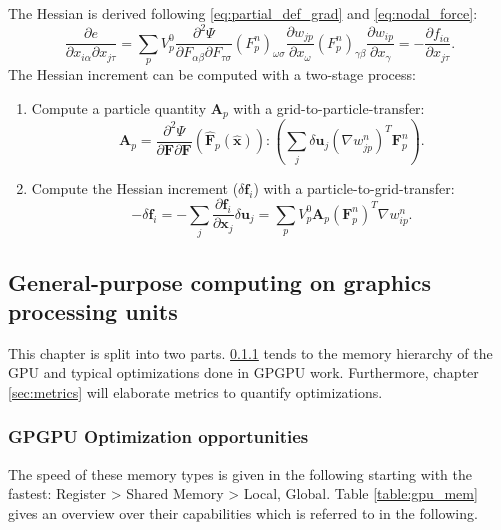 \documentclass[m,times]{cgMA}
\begin{document}
The Hessian is derived following \ref{eq:partial_def_grad} and \ref{eq:nodal_force}:
\begin{equation}
  \frac{\partial e}{\partial {x}_{i\alpha} \partial x_{j\tau}}
= \sum_p V^0_p\frac { \partial ^ { 2 } \Psi } { \partial  { F}_{\alpha \beta} \partial { F } _{\tau \sigma}}  (F^n_p)_{\omega \sigma}\frac{\partial w_{jp}}{\partial x_\omega} (F^n_p)_{\gamma\beta}\frac{\partial w_{ip}}{\partial x_\gamma} = -\frac{\partial {f}_{i\alpha}}{\partial x_{j\tau}}.
\end{equation}
The Hessian increment can be computed with a two-stage process:
\begin{enumerate}
  \item Compute a particle quantity $\boldsymbol{A}_p$ with a grid-to-particle-transfer:
    \begin{equation}\label{eq:Ap}
    \boldsymbol{A}_p = \frac { \partial ^ { 2 } \Psi } { \partial \boldsymbol { F } \partial \boldsymbol { F } } ( \hat { \boldsymbol { F } } _ { p } ( \hat { \boldsymbol { x } } )) : \left(\sum_j \delta \boldsymbol{u}_j (\nabla w_{jp}^n)^T \boldsymbol{F}^n_p\right).
    \end{equation}
  \item Compute the Hessian increment ($\delta \boldsymbol{f}_i$) with a particle-to-grid-transfer:
    \begin{equation}\label{eq:delta_f}
  - \delta \boldsymbol{f}_i = - \sum_j \frac{\partial \boldsymbol{f}_i}{\partial \boldsymbol{x}_j} \delta \boldsymbol{u}_j = \sum_p V_p^0 \boldsymbol{A}_p(\boldsymbol{F}^n_p)^T \nabla w_{ip}^n.
\end{equation}
\end{enumerate}
\clearpage
\subsection{General-purpose computing on graphics processing units}\label{sec:gpgpu}
This chapter is split into two parts. \ref{sec:optim} tends to the memory hierarchy of the GPU and typical optimizations done in GPGPU work. Furthermore, chapter \ref{sec:metrics} will elaborate metrics to quantify optimizations.
\subsubsection {GPGPU Optimization opportunities}\label{sec:optim}
The speed of these memory types is given in the following starting with the fastest:
Register > Shared Memory > Local, Global. Table \ref{table:gpu_mem} gives an overview over their capabilities which is referred to in the following.
\end{document}
